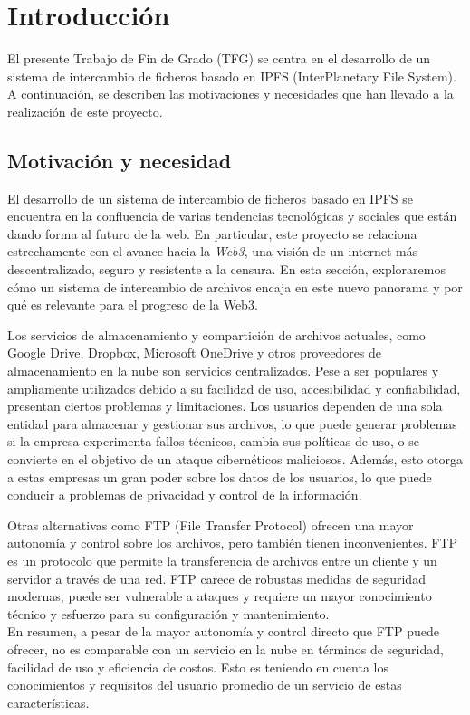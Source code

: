 \chapter{Introducción}\label{chap:1introduccion}
El presente Trabajo de Fin de Grado (TFG) se centra en el desarrollo de un sistema de intercambio de ficheros basado en
IPFS (InterPlanetary File System)\cite{IPFSPowersDistributed}.
\\A continuación, se describen las motivaciones y necesidades que han llevado a la realización de este proyecto.
\section{Motivación y necesidad}

El desarrollo de un sistema de intercambio de ficheros basado en IPFS se encuentra en la confluencia de varias tendencias
tecnológicas y sociales que están dando forma al futuro de la web. En particular, este proyecto se relaciona estrechamente
con el avance hacia la \textit{Web3}\cite{Web32023}, una visión de un internet más descentralizado, seguro y resistente a la censura.
En esta sección, exploraremos cómo un sistema de intercambio de archivos encaja en este nuevo panorama y por qué es relevante para el progreso de la Web3.

Los servicios de almacenamiento y compartición de archivos actuales, como Google Drive, Dropbox, Microsoft OneDrive y otros
proveedores de almacenamiento en la nube son servicios centralizados. Pese a ser  populares y ampliamente utilizados debido
a su facilidad de uso, accesibilidad y confiabilidad, presentan ciertos problemas y limitaciones. Los usuarios dependen de una
sola entidad para almacenar y gestionar sus archivos, lo que puede generar problemas si la empresa experimenta fallos técnicos,
cambia sus políticas de uso, o se convierte en el objetivo de un ataque cibernéticos maliciosos.
Además, esto otorga a estas empresas un gran poder sobre los datos de los usuarios, lo que puede conducir a problemas de privacidad y control de la información.

Otras alternativas como FTP (File Transfer Protocol) ofrecen una mayor autonomía y control sobre los archivos, pero también
tienen inconvenientes. FTP es un protocolo que permite la transferencia de archivos
entre un cliente y un servidor a través de una red. FTP carece de robustas medidas de seguridad modernas, puede ser vulnerable
a ataques y requiere un mayor conocimiento técnico y esfuerzo para su configuración y mantenimiento.
\\En resumen, a pesar de la mayor autonomía y control directo que FTP
puede ofrecer, no es comparable con un servicio en la nube en términos de seguridad, facilidad de uso y eficiencia de costos.
Esto es teniendo en cuenta los conocimientos y requisitos del usuario promedio de un servicio de estas características.

